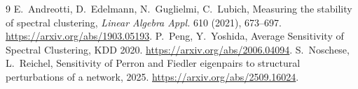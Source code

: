\documentclass[11pt]{article}
\begin{document}
\begin{thebibliography}{9}
 E.~Andreotti, D.~Edelmann, N.~Guglielmi, C.~Lubich,
Measuring the stability of spectral clustering,
\emph{Linear Algebra Appl.} 610 (2021), 673--697.
\url{https://arxiv.org/abs/1903.05193}.
 P.~Peng, Y.~Yoshida,
Average Sensitivity of Spectral Clustering, KDD 2020.
\url{https://arxiv.org/abs/2006.04094}.
 S.~Noschese, L.~Reichel,
Sensitivity of Perron and Fiedler eigenpairs to structural perturbations
of a network, 2025.
\url{https://arxiv.org/abs/2509.16024}.
\end{thebibliography}
\end{document}
